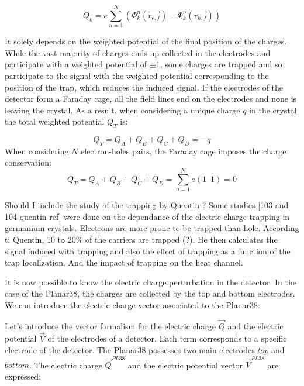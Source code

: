 \begin{equation}
\label{eq:ramo-induced-charge}
Q_k = e \sum_{n=1}^{N} \left( \Phi_k^n (\vec{r_{e,f}}) - \Phi_k^n (\vec{r_{h,f}}) \right)
\end{equation}

It solely depends on the weighted potential of the final position of the charges. While the vast majority of charges ends up collected in the electrodes and participate with a weighted potential of $\pm 1$, some charges are trapped and so participate to the signal with the weighted potential corresponding to the position of the trap, which reduces the induced signal.
If the electrodes of the detector form a Faraday cage, all the field lines end on the electrodes and none is leaving the crystal. As a result, when considering a unique charge $q$ in the crystal, the total weighted potential $Q_T$ is:

\begin{equation}
\label{eq:charge-conservation}
Q_T = Q_A + Q_B + Q_C + Q_D = -q
\end{equation}
When considering $N$ electron-holes pairs, the Faraday cage imposes the charge conservation:
\begin{equation}
\label{eq:charge-conservation}
Q_T = Q_A + Q_B + Q_C + Q_D = \sum_{n=1}^{N} e (1 – 1) = 0
\end{equation}

Should I include the study of the trapping by Quentin ? Some studies [103 and 104 quentin ref] were done on the dependance of the electric charge  trapping in germanium crystals. Electrons are more prone to be trapped than hole. According ti Quentin, 10 to 20\% of the carriers are trapped (?). He then calculates the signal induced with trapping and also the effect of trapping as a function of the trap localization. And the impact of trapping on the heat channel.

It is now possible to know the electric charge perturbation in the detector.
In the case of the Planar38, the charges are collected by the top and bottom electrodes. We can introduce the electric charge vector associated to the Planar38:

Let's introduce the vector formalism for the electric charge $\vec{Q}$ and the electric potential $\vec{V}$ of the electrodes of a detector. Each term corresponds to a specific electrode of the detector. The Planar38 possesses two main electrodes $top$ and $bottom$. The electric charge $\vec{Q}^{PL38}$ and the electric potential vector $\vec{V}^{PL38}$ are expressed:

